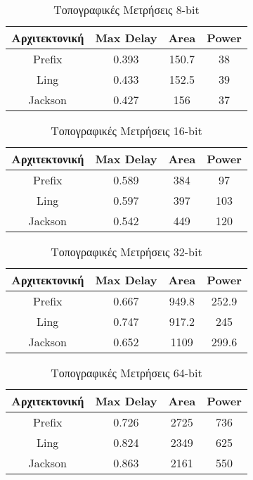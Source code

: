 \begin{table}[H]
\centering
     \begin{tabular}{||c | c  c  c ||} 
        \hline
        Αρχιτεκτονική & Max Delay & Area & Power \\ [0.5ex] 
        \hline\hline
        Prefix  & 0.393  & 150.7    & 38 \\ 
        \hline
        Ling    & 0.433  & 152.5    & 39 \\
        \hline
        Jackson & 0.427  & 156      & 37 \\
        \hline
    \end{tabular}
\caption{Τοπογραφικές Μετρήσεις 8-bit}
\label{topo_result_table_8}
\end{table}
\begin{table}[H]
\centering
     \begin{tabular}{||c | c  c  c ||} 
        \hline
        Αρχιτεκτονική & Max Delay & Area & Power \\ [0.5ex] 
        \hline\hline
        Prefix  & 0.589  & 384    & 97 \\ 
        \hline
        Ling    & 0.597  & 397    & 103 \\
        \hline
        Jackson & 0.542  & 449    & 120 \\
        \hline
    \end{tabular}
\caption{Τοπογραφικές Μετρήσεις 16-bit}
\label{topo_result_table_16}
\end{table}
\begin{table}[H]
\centering
     \begin{tabular}{||c | c  c  c ||} 
        \hline
        Αρχιτεκτονική & Max Delay & Area & Power \\ [0.5ex] 
        \hline\hline
        Prefix  & 0.667  & 949.8    & 252.9 \\ 
        \hline
        Ling    & 0.747  & 917.2    & 245 \\
        \hline
        Jackson & 0.652  & 1109    & 299.6 \\
        \hline
    \end{tabular}
\caption{Τοπογραφικές Μετρήσεις 32-bit}
\label{topo_result_table_32}
\end{table}
\begin{table}[H]
\centering
     \begin{tabular}{||c | c  c  c ||} 
        \hline
        Αρχιτεκτονική & Max Delay & Area & Power \\ [0.5ex] 
        \hline\hline
        Prefix  & 0.726  & 2725    & 736 \\ 
        \hline
        Ling    & 0.824  & 2349    & 625 \\
        \hline
        Jackson & 0.863  & 2161    & 550 \\
        \hline
    \end{tabular}
\caption{Τοπογραφικές Μετρήσεις 64-bit}
\label{topo_result_table_64}
\end{table}

